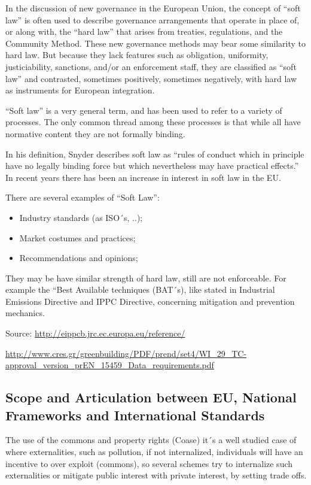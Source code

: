 \documentclass[]{book}
\theoremstyle{definition}
\theoremstyle{definition}
\theoremstyle{definition}
\theoremstyle{remark}
\begin{document}
In the discussion of new governance in the European Union, the concept
of ``soft law'' is often used to describe governance arrangements that
operate in place of, or along with, the ``hard law'' that arises from
treaties, regulations, and the Community Method. These new governance
methods may bear some similarity to hard law. But because they lack
features such as obligation, uniformity, justiciability, sanctions,
and/or an enforcement staff, they are classified as ``soft law'' and
contrasted, sometimes positively, sometimes negatively, with hard law as
instruments for European integration.

``Soft law'' is a very general term, and has been used to refer to a
variety of processes. The only common thread among these processes is
that while all have normative content they are not formally binding.

In his definition, Snyder describes soft law as ``rules of conduct which
in principle have no legally binding force but which nevertheless may
have practical effects.'' In recent years there has been an increase in
interest in soft law in the EU.

There are several examples of ``Soft Law'':

\begin{itemize}
\item
  Industry standards (as ISO´s, ..);
\item
  Market costumes and practices;
\item
  Recommendations and opinions;
\end{itemize}

They may be have similar strength of hard law, still are not
enforceable. For example the ``Best Available techniques (BAT´s), like
stated in Industrial Emissions Directive and IPPC Directive, concerning
mitigation and prevention mechanics.

Source: \url{http://eippcb.jrc.ec.europa.eu/reference/}

\url{http://www.cres.gr/greenbuilding/PDF/prend/set4/WI_29_TC-approval_version_prEN_15459_Data_requirements.pdf}

\subsection{Scope and Articulation between EU, National Frameworks and
International
Standards}\label{scope-and-articulation-between-eu-national-frameworks-and-international-standards}

The use of the commons and property rights (Coase) it´s a well studied
case of where externalities, such as pollution, if not internalized,
individuals will have an incentive to over exploit (commons), so several
schemes try to internalize such externalities or mitigate public
interest with private interest, by setting trade offs.
\end{document}
